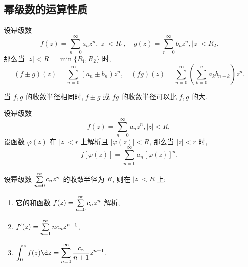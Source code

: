 % 
% 

% 

\subsection{幂级数的运算性质}

\begin{theorem}
	设幂级数
	\[f(z)=\sum_{n=0}^\infty a_nz^n,|z|<R_1,\quad
	g(z)=\sum_{n=0}^\infty b_nz^n,|z|<R_2.\]
	{那么当 $|z|<R=\min\{R_1,R_2\}$ 时,
	\[(f\pm g)(z)=\sum_{n=0}^\infty (a_n\pm b_n)z^n,\quad
	(fg)(z)=\sum_{n=0}^\infty\left(\sum_{k=0}^na_kb_{n-k}\right)z^n.\]}
\end{theorem}

当 $f,g$ 的收敛半径相同时, $f\pm g$ 或 $fg$ 的收敛半径可以比 $f,g$ 的大.

\begin{theorem}
	设幂级数
	\[f(z)=\sum_{n=0}^\infty a_nz^n,|z|<R,\]
	设函数 $\varphi(z)$ 在 $|z|<r$ 上解析且 $|\varphi(z)|<R$, 
	{那么当 $|z|<r$ 时,
	\[f[\varphi(z)]=\sum_{n=0}^\infty a_n[\varphi(z)]^n.\]}
\end{theorem}

\begin{theorem}
	设幂级数 $\sum\limits_{n=0}^\infty c_nz^n$ 的收敛半径为 $R$, 则在 $|z|<R$ 上:
	\begin{enumerate}
		\item 它的和函数 $f(z)=\sum\limits_{n=0}^\infty c_nz^n$ 解析,
		\item $f'(z)=\sum\limits_{n=1}^\infty nc_nz^{n-1}$,
		\item $\displaystyle\int_0^zf(z)\d z=\sum_{n=0}^\infty \frac{c_n}{n+1}z^{n+1}$.
	\end{enumerate}
\end{theorem}

